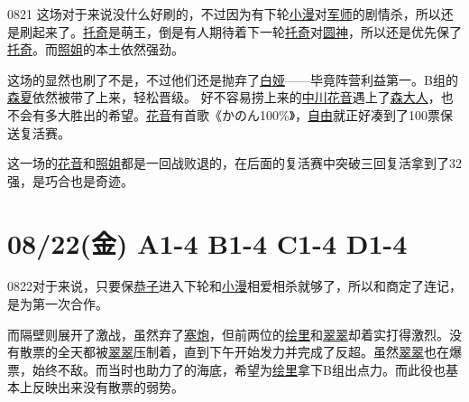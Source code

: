 0821 这场对于来说没什么好刷的，不过因为有下轮\uline{小漫}对\uline{军师}的剧情杀，所以还是刷起来了。\uline{托奇}是萌王，倒是有人期待着下一轮\uline{托奇}对\uline{圆神}，所以还是优先保了\uline{托奇}。而\uline{照姐}的本土依然强劲。

这场的显然也刷了不是，不过他们还是抛弃了\uline{白娅}——毕竟阵营利益第一。B组的\uline{森夏}依然被带了上来，轻松晋级。
好不容易捞上来的\uline{中川花音}遇上了\uline{森大人}，也不会有多大胜出的希望。\uline{花音}有首歌{《{\mincho かのん$\!$100\%}》}，\uline{自由}就正好凑到了100票保送复活赛。

这一场的\uline{花音}和\uline{照姐}都是一回战败退的，在后面的复活赛中突破三回复活拿到了32强，是巧合也是奇迹。

\section{08/22(金) A1-4 B1-4 C1-4 D1-4}


0822对于来说，只要保\uline{恭子}进入下轮和\uline{小漫}相爱相杀就够了，所以和商定了连记，是为第一次合作。

而隔壁则展开了激战，虽然弃了\uline{塞炮}，但前两位的\uline{绘里}和\uline{翠翠}却着实打得激烈。没有散票的全天都被\uline{翠翠}压制着，直到下午开始发力并完成了反超。虽然\uline{翠翠}也在爆票，始终不敌。而当时也助力了的海底，希望为\uline{绘里}拿下B组出点力。而此役也基本上反映出来没有散票的弱势。

